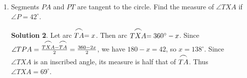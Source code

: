 \documentclass{article}
\theoremstyle{definition}
\newtheorem*{solution}{Solution}
\begin{document}
\begin{multicols}{2}
\begin{enumerate}
\begin{center}
\begin{tikzpicture}
                \end{tikzpicture}
            \end{center}
            \begin{solution}
                We know that $\angle CBD$ is one-half arc $\stackrel{\mbox{\large$\frown$}}{CD}$, but we don't know what arc $\stackrel{\mbox{\large$\frown$}}{CD}$ is.
                We can also find $\angle CBD$ by finding the other two angles of $\triangle CBD$ and subtracting their sum from $180^{\circ}$
                We already have $\angle C$, and $\angle D$ is one-half arc $\stackrel{\mbox{\large$\frown$}}{BC}$.
                Since arc $\stackrel{\mbox{\large$\frown$}}{BC} = 2 \cdot \angle ABC = 120^{\circ}$, we have $\angle D = 60^{\circ}$, and $\angle CBD = 180^{\circ} - \angle C - \angle D = 50^{\circ}$.
            \end{solution}
        \item Segments $PA$ and $PT$ are tangent to the circle.
            Find the measure of $\angle TXA$ if $\angle P = 42^{\circ}$.
            \begin{center}
            \end{center}
            \begin{solution}
                Let arc $\stackrel{\mbox{\large$\frown$}}{TA} = x$.
                Then arc $\stackrel{\mbox{\large$\frown$}}{TXA} = 360^{\circ} - x$.
                Since $\angle TPA = \frac{\stackrel{\mbox{\large$\frown$}}{TXA} - \stackrel{\mbox{\large$\frown$}}{TA}}{2} = \frac{360 -2x}{2}$, we have $180 - x = 42$, so $x = 138^{\circ}$.
                Since $\angle TXA$ is an inscribed angle, its measure is half that of $\stackrel{\mbox{\large$\frown$}}{TA}$.
                Thus $\angle TXA = 69^{\circ}$.
            \end{solution}
    \end{enumerate}
\end{multicols}
\end{document}
